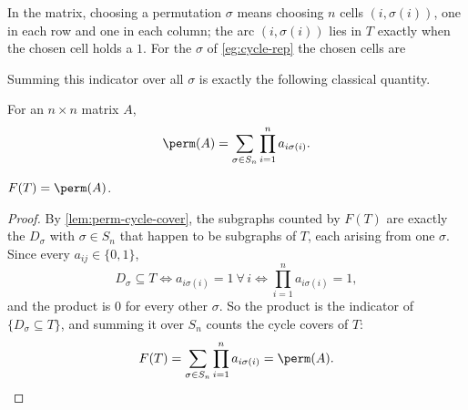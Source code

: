 In the matrix, choosing a permutation \(\sigma\) means choosing \(n\) cells \((i, \sigma(i))\), one in each row and one in each column; the arc \((i,\sigma(i))\) lies in \(T\) exactly when the chosen cell holds a \(1\). For the \(\sigma\) of \autoref{eg:cycle-rep} the chosen cells are
\begin{center}
\end{center}

Summing this indicator over all \(\sigma\) is exactly the following classical quantity.

\begin{definition}[Permanent]\label{def:permanent}
    For an \(n \times n\) matrix \(A\),
    \[
        \perm(A) = \sum_{\sigma \in S_n} \prod_{i=1}^{n} a_{i\sigma(i)}.
    \]
\end{definition}

\begin{lemma}\label{lem:F-is-permanent}
    \(F(T) = \perm(A)\).
\end{lemma}

\begin{proof}
    By \autoref{lem:perm-cycle-cover}, the subgraphs counted by \(F(T)\) are exactly the \(D_\sigma\) with \(\sigma \in S_n\) that happen to be subgraphs of \(T\), each arising from one \(\sigma\). Since every \(a_{ij} \in \{0,1\}\),
    \[
        D_\sigma \subseteq T
        \iff a_{i\sigma(i)} = 1 \ \forall\, i
        \iff \prod_{i=1}^{n} a_{i\sigma(i)} = 1,
    \]
    and the product is \(0\) for every other \(\sigma\). So the product is the indicator of \(\{D_\sigma \subseteq T\}\), and summing it over \(S_n\) counts the cycle covers of \(T\):
    \[
        F(T) = \sum_{\sigma \in S_n} \prod_{i=1}^{n} a_{i\sigma(i)} = \perm(A). \qedhere
    \]
\end{proof}

